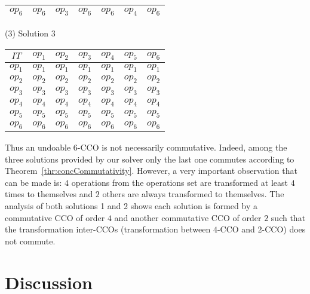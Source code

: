\documentclass[submission,copyright,creativecommons]{eptcs}
\begin{document}
\begin{table*}[htbp]
\begin{scriptsize}
\begin{minipage}[t]{0.5\linewidth}
\begin{tabular}{|c|c|c|c|c|c|c|}
$op_6$& $op_6$& $op_3$ &$op_6$& $op_6$ & $op_4$& $op_6$ \\ \hline
\end{tabular}
   \end{minipage}
   \hfill \hfill
	 \begin{minipage}[t]{0.99\linewidth}
\centerline{(3) Solution 3}
      \centering 
   \begin{tabular}{|c|c|c|c|c|c|c|}
\hline
$IT$&  $op_1$ &   $op_2$& $op_3$ &   $op_4$& $op_5$ & $op_6$  \\ \hline
$op_1$& $op_1$& $op_1$ &$op_1$& $op_1$ & $op_1$& $op_1$ \\ \hline 
$op_2$& $op_2$& $op_2$ &$op_2$& $op_2$ & $op_2$& $op_2$ \\ \hline 
$op_3$& $op_3$& $op_3$ &$op_3$& $op_3$ & $op_3$ & $op_3$ \\ \hline
$op_4$& $op_4$& $op_4$ &$op_4$& $op_4$ & $op_4$ & $op_4$ \\ \hline
$op_5$& $op_5$& $op_5$ &$op_5$& $op_5$ & $op_5$& $op_5$ \\ \hline
$op_6$& $op_6$& $op_6$ &$op_6$& $op_6$ & $op_6$& $op_6$ \\ \hline
\end{tabular}
   \end{minipage}
	\end{scriptsize}
   \label{fig:6CCO}
\end{table*}



Thus an undoable 6-CCO is not necessarily commutative. Indeed, among the three  solutions provided by our solver only the last one commutes according to Theorem~\ref{thr:concCommutativity}. However, a very important observation that can be made is: $4$ operations from the operations set are transformed at least $4$ times to themselves and $2$ others are always transformed to themselves. The analysis of both solutions 1 and 2 shows each solution is formed by a commutative CCO of order $4$ and another commutative CCO of order $2$ such that the transformation inter-CCOs (transformation between $4$-CCO and $2$-CCO) does not commute. 


\section{Discussion}   
\end{document}
